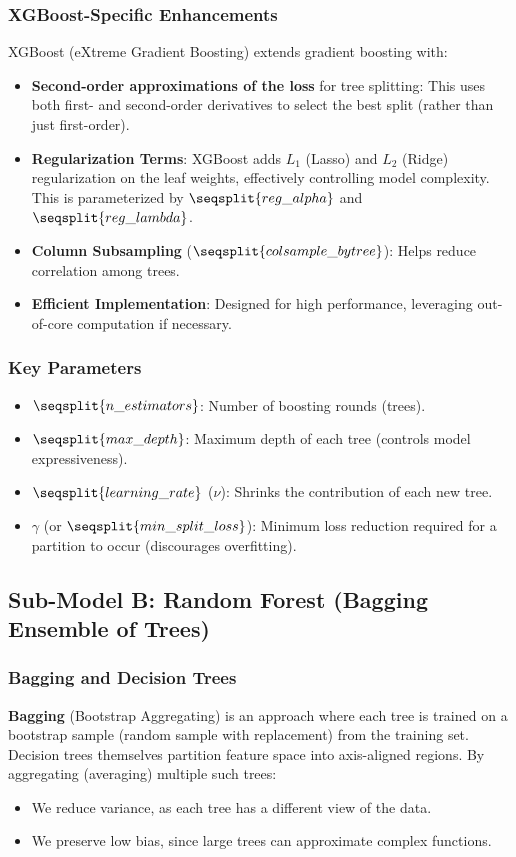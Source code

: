 \documentclass[12pt]{article}
\begin{document}
\subsubsection{XGBoost-Specific Enhancements}
XGBoost (eXtreme Gradient Boosting) extends gradient boosting with:
\begin{itemize}[noitemsep]
    \item \textbf{Second-order approximations of the loss} for tree splitting: This uses both first- and second-order derivatives to select the best split (rather than just first-order).
    \item \textbf{Regularization Terms}: XGBoost adds \(L_1\) (Lasso) and \(L_2\) (Ridge) regularization on the leaf weights, effectively controlling model complexity. This is parameterized by \(\seqsplit{reg\_alpha}\) and \(\seqsplit{reg\_lambda}\).
    \item \textbf{Column Subsampling} (\(\seqsplit{colsample\_bytree}\)): Helps reduce correlation among trees.
    \item \textbf{Efficient Implementation}: Designed for high performance, leveraging out-of-core computation if necessary.
\end{itemize}

\subsubsection{Key Parameters}
\begin{itemize}[noitemsep]
    \item \(\seqsplit{n\_estimators}\): Number of boosting rounds (trees).
    \item \(\seqsplit{max\_depth}\): Maximum depth of each tree (controls model expressiveness).
    \item \(\seqsplit{learning\_rate}\) (\(\nu\)): Shrinks the contribution of each new tree.
    \item \(\gamma\) (or \(\seqsplit{min\_split\_loss}\)): Minimum loss reduction required for a partition to occur (discourages overfitting).
\end{itemize}

\subsection{Sub-Model B: Random Forest (Bagging Ensemble of Trees)}

\subsubsection{Bagging and Decision Trees}
\textbf{Bagging} (Bootstrap Aggregating) is an approach where each tree is trained on a bootstrap sample (random sample with replacement) from the training set. Decision trees themselves partition feature space into axis-aligned regions. By aggregating (averaging) multiple such trees:
\begin{itemize}[noitemsep]
    \item We reduce variance, as each tree has a different view of the data.
    \item We preserve low bias, since large trees can approximate complex functions.
\end{itemize}
\end{document}
